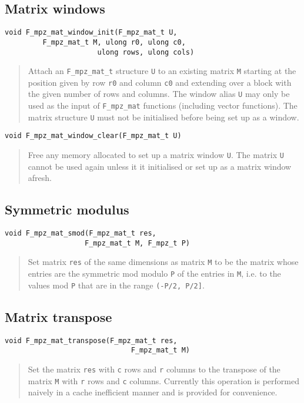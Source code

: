 \documentclass[a4paper,10pt]{article}
\newcommand{\code}{\lstinline}
\begin{document}
\subsection{Matrix windows}

\begin{lstlisting}
void F_mpz_mat_window_init(F_mpz_mat_t U, 
         F_mpz_mat_t M, ulong r0, ulong c0, 
                      ulong rows, ulong cols)
\end{lstlisting}
\begin{quote}
Attach an \code{F_mpz_mat_t} structure \code{U} to an existing matrix \code{M} starting at the position
given by row \code{r0} and column \code{c0} and extending over a block with the given number of rows and
columns. The window alias \code{U} may only be used as the input of \code{F_mpz_mat} functions (including
vector functions). The matrix structure \code{U} must not be initialised before being set up as a window.
\end{quote}

\begin{lstlisting}
void F_mpz_mat_window_clear(F_mpz_mat_t U)
\end{lstlisting}
\begin{quote}
Free any memory allocated to set up a matrix window \code{U}. The matrix \code{U} cannot be used again 
unless it it initialised or set up as a matrix window afresh.
\end{quote}

\subsection{Symmetric modulus}

\begin{lstlisting}
void F_mpz_mat_smod(F_mpz_mat_t res, 
                   F_mpz_mat_t M, F_mpz_t P)
\end{lstlisting}
\begin{quote}
Set matrix \code{res} of the same dimensions as matrix \code{M} to be the matrix whose entries are the
symmetric mod modulo \code{P} of the entries in \code{M}, i.e. to the values mod \code{P} that are in
the range \code{(-P/2, P/2]}.
\end{quote}

\subsection{Matrix transpose}

\begin{lstlisting}
void F_mpz_mat_transpose(F_mpz_mat_t res, 
                              F_mpz_mat_t M)
\end{lstlisting}
\begin{quote}
Set the matrix \code{res} with \code{c} rows and \code{r} columns to the transpose of the matrix \code{M}
with \code{r} rows and \code{c} columns. Currently this operation is performed naively in a cache 
inefficient manner and is provided for convenience.
\end{quote}
\end{document}
